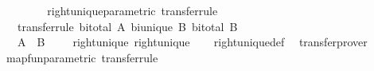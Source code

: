 \begin{isabellebody}
\isanewline
\ \ \ \ \isamarkupfalse%
\isanewline
\ \ \isacommand{{\isacharbraceright}{\kern0pt}}\isamarkupfalse%
\isanewline
{}\isamarkupfalse%
%
\endisatagproof
{\isafoldproof}%
%
\isadelimproof
\isanewline
%
\endisadelimproof
\isanewline
{}\isamarkupfalse%
\ right{\isacharunderscore}{\kern0pt}unique{\isacharunderscore}{\kern0pt}parametric\ {\isacharbrackleft}{\kern0pt}transfer{\isacharunderscore}{\kern0pt}rule{\isacharbrackright}{\kern0pt}{\isacharcolon}{\kern0pt}\isanewline
\ \ \ {\isacharbrackleft}{\kern0pt}transfer{\isacharunderscore}{\kern0pt}rule{\isacharbrackright}{\kern0pt}{\isacharcolon}{\kern0pt}\ {\isachardoublequoteopen}bi{\isacharunderscore}{\kern0pt}total\ A{\isachardoublequoteclose}\ {\isachardoublequoteopen}bi{\isacharunderscore}{\kern0pt}unique\ B{\isachardoublequoteclose}\ {\isachardoublequoteopen}bi{\isacharunderscore}{\kern0pt}total\ B{\isachardoublequoteclose}\isanewline
\ \ \ {\isachardoublequoteopen}{\isacharparenleft}{\kern0pt}{\isacharparenleft}{\kern0pt}A\ {\isacharequal}{\kern0pt}{\isacharequal}{\kern0pt}{\isacharequal}{\kern0pt}{\isachargreater}{\kern0pt}\ B\ {\isacharequal}{\kern0pt}{\isacharequal}{\kern0pt}{\isacharequal}{\kern0pt}{\isachargreater}{\kern0pt}\ {\isacharparenleft}{\kern0pt}{\isacharequal}{\kern0pt}{\isacharparenright}{\kern0pt}{\isacharparenright}{\kern0pt}\ {\isacharequal}{\kern0pt}{\isacharequal}{\kern0pt}{\isacharequal}{\kern0pt}{\isachargreater}{\kern0pt}\ {\isacharparenleft}{\kern0pt}{\isacharequal}{\kern0pt}{\isacharparenright}{\kern0pt}{\isacharparenright}{\kern0pt}\ right{\isacharunderscore}{\kern0pt}unique\ right{\isacharunderscore}{\kern0pt}unique{\isachardoublequoteclose}\isanewline
%
\isadelimproof
\ \ %
\endisadelimproof
%
\isatagproof
{}\isamarkupfalse%
\ right{\isacharunderscore}{\kern0pt}unique{\isacharunderscore}{\kern0pt}def\ \isamarkupfalse%
\ transfer{\isacharunderscore}{\kern0pt}prover%
\endisatagproof
{\isafoldproof}%
%
\isadelimproof
\isanewline
%
\endisadelimproof
\isanewline
{}\isamarkupfalse%
\ map{\isacharunderscore}{\kern0pt}fun{\isacharunderscore}{\kern0pt}parametric\ {\isacharbrackleft}{\kern0pt}transfer{\isacharunderscore}{\kern0pt}rule{\isacharbrackright}{\kern0pt}{\isacharcolon}{\kern0pt}\isanewline

\end{isabellebody}
